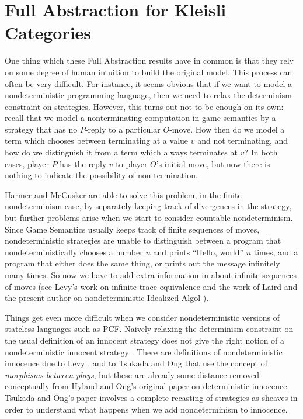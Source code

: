 \section{Full Abstraction for Kleisli Categories}

One thing which these Full Abstraction results have in common is that they rely on some degree of human intuition to build the original model.  
This process can often be very difficult.  
For instance, it seems obvious that if we want to model a nondeterministic programming language, then we need to relax the determinism constraint on strategies.  
However, this turns out not to be enough on its own: recall that we model a nonterminating computation in game semantics by a strategy that has no $P$-reply to a particular $O$-move.  
How then do we model a term which chooses between terminating at a value $v$ and not terminating, and how do we distinguish it from a term which always terminates at $v$?  
In both cases, player $P$ has the reply $v$ to player $O$'s initial move, but now there is nothing to indicate the possibility of non-termination.  

Harmer and McCusker are able to solve this problem, in the finite nondeterminism case, by separately keeping track of divergences in the strategy, but further problems arise when we start to consider countable nondeterminism.  
Since Game Semantics usually keeps track of finite sequences of moves, nondeterministic strategies are unable to distinguish between a program that nondeterministically chooses a number $n$ and prints ``Hello, world'' $n$ times, and a program that either does the same thing, or prints out the message infinitely many times.
So now we have to add extra information in about infinite sequences of moves (see Levy's work on infinite trace equivalence \cite{LevyGsInfinite} and the work of Laird and the present author on nondeterministic Idealized Algol \cite{CslPaper}).

Things get even more difficult when we consider nondeterministic versions of stateless languages such as PCF.  
Naively relaxing the determinism constraint on the usual definition of an innocent strategy does not give the right notion of a nondeterministic innocent strategy \cite{TsukadaSheaves}.  
There are definitions of nondeterministic innocence due to Levy \cite{levy2014morphisms}, and to Tsukada and Ong \cite{TsukadaSheaves} that use the concept of \emph{morphisms between plays}, but these are already some distance removed conceptually from Hyland and Ong's original paper on deterministic innocence.
Tsukada and Ong's paper involves a complete recasting of strategies as sheaves in order to understand what happens when we add nondeterminism to innocence.

